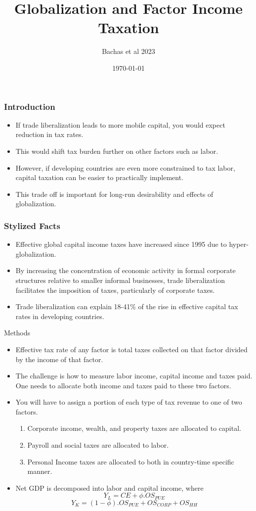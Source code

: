 \documentclass{beamer}
\title{Globalization and Factor Income Taxation}
\author{Bachas et al 2023}
\date{\today}
\begin{document}
\frame{\titlepage}

\begin{frame}
\frametitle{Introduction}
\begin{itemize}
\item If trade liberalization leads to more mobile capital, you would expect reduction in tax rates. 
\item This would shift tax burden further on other factors such as labor.
\item However, if developing countries are even more constrained to tax labor, capital taxation can be easier to practically implement. 
\item This trade off is important for long-run desirability and effects of globalization. 

\end{itemize}
\end{frame}

\begin{frame}
\frametitle{Stylized Facts }
\begin{itemize}
    \item Effective global capital income taxes have increased since 1995 due to hyper-globalization. 
    \item By increasing the concentration
of economic activity in formal corporate structures relative to smaller informal businesses, trade liberalization facilitates the imposition of taxes, particularly of corporate taxes.
\item Trade liberalization can explain 18-41\% of the
rise in effective capital tax rates in developing countries.
\end{itemize}
\end{frame}

\begin{frame}{Methods}
\begin{itemize}
\item Effective tax rate of any factor is total taxes collected on that factor divided by the income of that factor. 
\item The challenge is how to measure labor income, capital income and taxes paid. One needs to allocate both income and taxes paid to these two factors. 
\item You will have to assign a portion of each type of tax revenue to one of two factors. 
\begin{enumerate}
    \item Corporate income, wealth, and property taxes are allocated to capital. 
    \item Payroll and social taxes are allocated to labor. 
    \item Personal Income taxes are allocated to both in country-time specific manner.
\end{enumerate}
\item Net GDP is decomposed into labor and capital income, where 
\[Y_L = CE+ \phi.OS_{PUE} \]
\[Y_K = (1-\phi) . OS_{PUE}+OS_{CORP}+ OS_{HH}\]

\end{itemize}
\end{frame}
\end{document}
